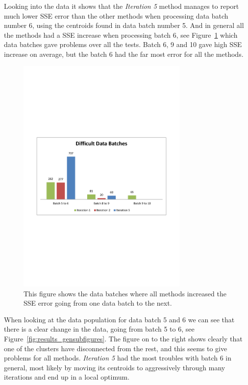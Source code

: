 Looking into the data it shows that the \textit{Iteration 5} method manages to report much lower SSE error than the other methods when processing data batch number 6, using the centroids found in data batch number 5. And in general all the methods had a SSE increase when processing batch 6, see Figure~\ref{fig:results_gen_DifficultDataBatches} which data batches gave problems over all the tests. Batch 6, 9 and 10 gave high SSE increase on average, but the batch 6 had the far most error for all the methods. 

\begin{figure}[ht]
\centering
\includegraphics[trim = 10mm 90mm 10mm 95mm, clip, width=0.75\textwidth]{Figures/experiments/gen_DifficultDataBatches.pdf}
\caption{This figure shows the data batches where all methods increased the SSE error going from one data batch to the next. }
\label{fig:results_gen_DifficultDataBatches}
\end{figure}

When looking at the data population for data batch 5 and 6 we can see that there is a clear change in the data, going from batch 5 to 6, see Figure~\ref{fig:results_gensubfigures}. The figure on to the right shows clearly that one of the clusters have disconnected from the rest, and this seems to give problems for all methods. \textit{Iteration 5} had the most troubles with batch 6 in general, most likely by moving its centroids to aggressively through many iterations and end up in a local optimum.



